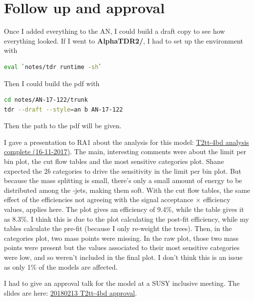 

\section{Follow up and approval}

Once I added everything to the AN, I could build a draft copy to see how everything looked. If I went to \textbf{AlphaTDR2/}, I had to set up the environment with

\begin{lstlisting}[belowskip=-0.7cm, language=sh, numbers=none]
eval `notes/tdr runtime -sh`
\end{lstlisting}

Then I could build the pdf with

\begin{lstlisting}[belowskip=-0.7cm, language=sh, numbers=none]
cd notes/AN-17-122/trunk
tdr --draft --style=an b AN-17-122
\end{lstlisting}

Then the path to the pdf will be given.

I gave a presentation to RA1 about the analysis for this model: \href{run:./sec31/T2tt-4bd analysis complete (16-11-2017).pdf}{T2tt-4bd analysis complete (16-11-2017)}. The main, interesting comments were about the limit per bin plot, the cut flow tables and the most sensitive \njet categories plot. Shane expected the $2b$ categories to drive the sensitivity in the limit per bin plot. But because the mass splitting is small, there's only a small amount of energy to be distributed among the \Pqb-jets, making them soft. With the cut flow tables, the same effect of the efficiencies not agreeing with the signal acceptance $\times$ efficiency values, applies here. The plot gives an efficiency of 9.4\%, while the table gives it as 8.3\%. I think this is due to the plot calculating the post-fit efficiency, while my tables calculate the pre-fit (because I only re-weight the trees). Then, in the \njet categories plot, two mass points were missing. In the raw plot, those two mass points were present but the values associated to their most sensitive categories were low, and so weren't included in the final plot. I don't think this is an issue as only 1\% of the models are affected.

I had to give an approval talk for the model at a SUSY inclusive meeting. The slides are here: \href{run:./sec31/T20180213 T2tt-4bd approval.pdf}{20180213 T2tt-4bd approval}.


